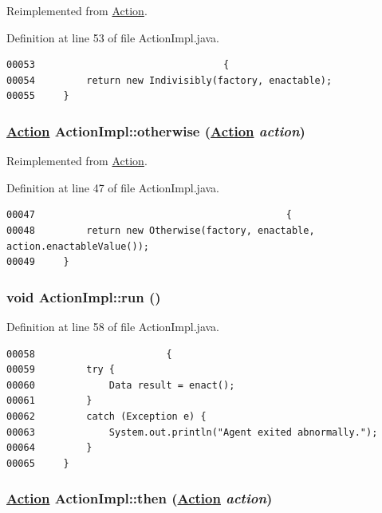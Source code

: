 Reimplemented from \hyperlink{interfaceAction_a9}{Action}.

Definition at line 53 of file Action\-Impl.java.\footnotesize\begin{verbatim}00053                                 {
00054         return new Indivisibly(factory, enactable);
00055     }
\end{verbatim}\normalsize 
\hypertarget{classActionImpl_a17}{
\subsubsection[otherwise]{\setlength{\rightskip}{0pt plus 5cm}\hyperlink{interfaceAction}{Action} Action\-Impl::otherwise (\hyperlink{interfaceAction}{Action} {\em action})}}
\label{classActionImpl_a17}




Reimplemented from \hyperlink{interfaceAction_a7}{Action}.

Definition at line 47 of file Action\-Impl.java.\footnotesize\begin{verbatim}00047                                            {
00048         return new Otherwise(factory, enactable, action.enactableValue());
00049     }
\end{verbatim}\normalsize 
\hypertarget{classActionImpl_a20}{
\subsubsection[run]{\setlength{\rightskip}{0pt plus 5cm}void Action\-Impl::run ()}}
\label{classActionImpl_a20}




Definition at line 58 of file Action\-Impl.java.\footnotesize\begin{verbatim}00058                       {
00059         try {
00060             Data result = enact();
00061         }
00062         catch (Exception e) {
00063             System.out.println("Agent exited abnormally.");
00064         }
00065     }
\end{verbatim}\normalsize 
\hypertarget{classActionImpl_a12}{
\subsubsection[then]{\setlength{\rightskip}{0pt plus 5cm}\hyperlink{interfaceAction}{Action} Action\-Impl::then (\hyperlink{interfaceAction}{Action} {\em action})}}
\label{classActionImpl_a12}




